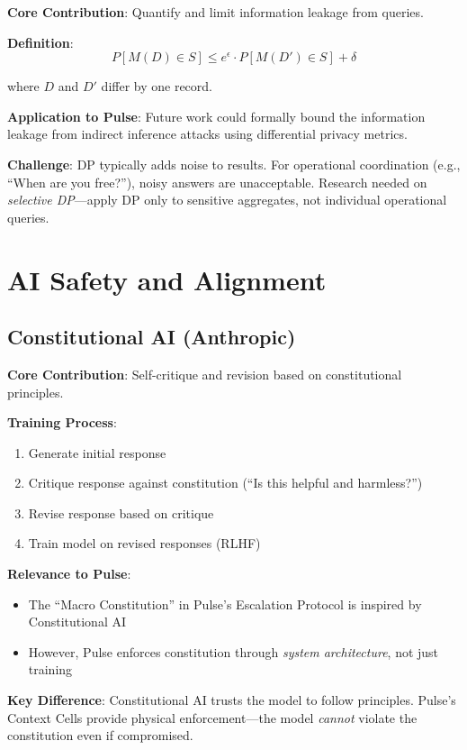 \textbf{Core Contribution}: Quantify and limit information leakage from queries.

\textbf{Definition}:
\[
P[M(D) \in S] \leq e^{\epsilon} \cdot P[M(D') \in S] + \delta
\]

where $D$ and $D'$ differ by one record.

\textbf{Application to Pulse}: Future work could formally bound the information leakage from indirect inference attacks using differential privacy metrics.

\textbf{Challenge}: DP typically adds noise to results. For operational coordination (e.g., ``When are you free?''), noisy answers are unacceptable. Research needed on \textit{selective DP}—apply DP only to sensitive aggregates, not individual operational queries.

\section{AI Safety and Alignment}

\subsection{Constitutional AI (Anthropic)}

\textbf{Core Contribution}: Self-critique and revision based on constitutional principles.

\textbf{Training Process}:
\begin{enumerate}
    \item Generate initial response
    \item Critique response against constitution (``Is this helpful and harmless?'')
    \item Revise response based on critique
    \item Train model on revised responses (RLHF)
\end{enumerate}

\textbf{Relevance to Pulse}:
\begin{itemize}
    \item The ``Macro Constitution'' in Pulse's Escalation Protocol is inspired by Constitutional AI
    \item However, Pulse enforces constitution through \textit{system architecture}, not just training
\end{itemize}

\textbf{Key Difference}: Constitutional AI trusts the model to follow principles. Pulse's Context Cells provide physical enforcement—the model \textit{cannot} violate the constitution even if compromised.

